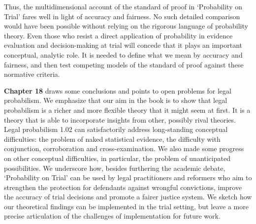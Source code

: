 \documentclass[
  10pt,
  dvipsnames,enabledeprecatedfontcommands]{scrartcl}
\begin{document}
Thus, the multidimensional account of the standard of proof in
`Probability on Trial' fares well in light of accuracy and fairness. No
such detailed comparison would have been possible without relying on the
rigorous language of probability theory. Even those who resist a direct
application of probability in evidence evaluation and decision-making at
trial will concede that it plays an important conceptual, analytic role.
It is needed to define what we mean by accuracy and fairness, and then
test competing models of the standard of proof against these normative
criteria.

\textbf{Chapter 18} draws some conclusions and points to open problems
for legal probabilism. We emphasize that our aim in the book is to show
that legal probabilism is a richer and more flexible theory that it
might seem at first. It is a theory that is able to incorporate insights
from other, possibly rival theories. Legal probabilism 1.02 can
satisfactorily address long-standing conceptual difficulties: the
problem of naked statistical evidence, the difficulty with conjunction,
corroboration and cross-examination. We also made some progress on other
conceptual difficulties, in particular, the problem of unanticipated
possibilities. We underscore how, besides furthering the academic
debate, `Probability on Trial' can be used by legal practitioners and
reformers who aim to strengthen the protection for defendants against
wrongful convictions, improve the accuracy of trial decisions and
promote a fairer justice system. We sketch how our theoretical findings
can be implemented in the trial setting, but leave a more precise
articulation of the challenges of implementation for future work.

\vspace{1mm}
\end{document}
